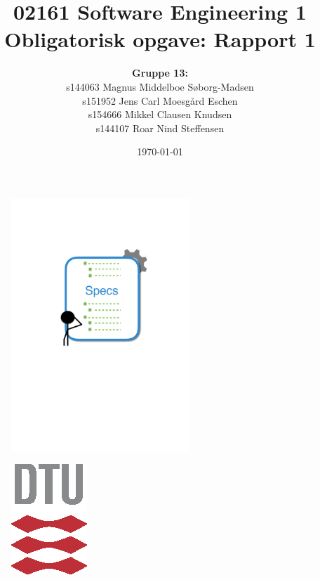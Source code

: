 


\title{02161 Software Engineering 1 \\
Obligatorisk opgave: Rapport 1}
\author{\textbf{Gruppe 13:} \\ 
s144063	Magnus Middelboe Søborg-Madsen \\
s151952	Jens Carl Moesgård Eschen \\
s154666	Mikkel Clausen Knudsen \\
s144107	Roar Nind Steffensen}
\date{\today}


\maketitle

\begin{figure}[H]
    \centering
    \includegraphics[width = 0.6\textwidth]{Figurer/frontpage.pdf}
\end{figure}

\vspace{0.5 cm}

\begin{figure}[H]
    \centering
    \includegraphics{Figurer/DTU3CMYK.eps}
\end{figure}

